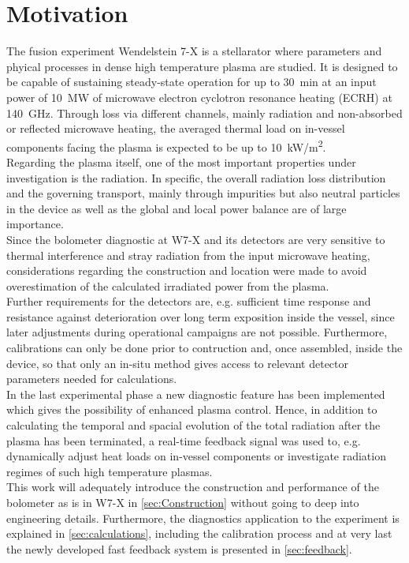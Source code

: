 \documentclass[
    aps,%
    twocolumn,%
    secnumarabic,%
    amssymb,%
    prd,%
    10pt%
    ]{revtex4-1}
\begin{document}
\section{Motivation}\label{sec:Motivation}
    The fusion experiment Wendelstein 7-X is a stellarator where parameters and phyical processes in dense high temperature plasma are studied. It is designed to be capable of sustaining steady-state operation for up to \mbox{\SI{30}{\minute}} at an input power of \mbox{\SI{10}{\mega\watt}} of microwave electron cyclotron resonance heating (ECRH) at \SI{140}{GHz}. Through loss via different channels, mainly radiation and non-absorbed or reflected microwave heating, the averaged thermal load on in-vessel components facing the plasma is expected to be up to \mbox{\SI{10}{\kilo\watt/\square\meter}.}\\%
    Regarding the plasma itself, one of the most important properties under investigation is the radiation. In specific, the overall radiation loss distribution and the governing transport, mainly through impurities but also neutral particles in the device as well as the global and local power balance are of large importance.\\%
    Since the bolometer diagnostic at W7-X and its detectors are very sensitive to thermal interference and stray radiation from the input microwave heating, considerations regarding the construction and location were made to avoid overestimation of the calculated irradiated power from the plasma.\\%
    Further requirements for the detectors are, e.g. sufficient time response and resistance against deterioration over long term exposition inside the vessel, since later adjustments during operational campaigns are not possible. Furthermore, calibrations can only be done prior to contruction and, once assembled, inside the device, so that only an in-situ method gives access to relevant detector parameters needed for calculations.\\%
    In the last experimental phase a new diagnostic feature has been implemented which gives the possibility of enhanced plasma control. Hence, in addition to calculating the temporal and spacial evolution of the total radiation after the plasma has been terminated, a real-time feedback signal was used to, e.g. dynamically adjust heat loads on in-vessel components or investigate radiation regimes of such high temperature plasmas.\\%
    This work will adequately introduce the construction and performance of the bolometer as is in W7-X in \cref{sec:Construction} without going to deep into engineering details. Furthermore, the diagnostics application to the experiment is explained in \cref{sec:calculations}, including the calibration process and at very last the newly developed fast feedback system is presented in \cref{sec:feedback}.%
%
\end{document}
